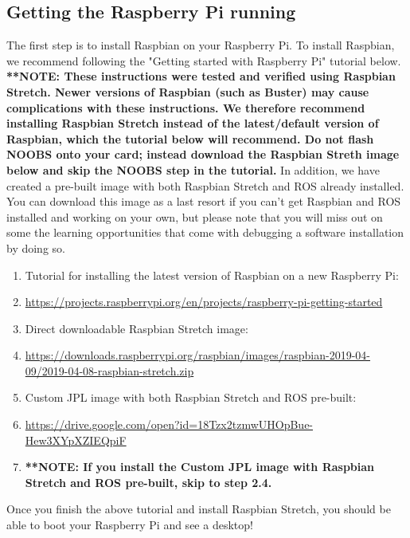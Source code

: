 \documentclass{article}
\begin{document}
\subsection{Getting the Raspberry Pi running}
The first step is to install Raspbian on your Raspberry Pi. To install Raspbian,
we recommend following the "Getting started with Raspberry Pi" tutorial below.  \textbf{**NOTE: These instructions were tested and verified using Raspbian Stretch.  Newer versions of Raspbian (such as Buster) may cause complications with these instructions.  We therefore recommend installing Raspbian Stretch instead of the latest/default version of Raspbian, which the tutorial below will recommend.  Do not flash NOOBS onto your card; instead download the Raspbian Streth image below and skip the NOOBS step in the tutorial.}  In addition, we have created a pre-built image with both Raspbian Stretch and ROS already installed.  You can download this image as a last resort if you can't get Raspbian and ROS installed and working on your own, but please note that you will miss out on some the learning opportunities that come with debugging a software installation by doing so.  

\begin{enumerate}
	\item[] Tutorial for installing the latest version of Raspbian on a new Raspberry Pi:
	\item[] \href{https://projects.raspberrypi.org/en/projects/raspberry-pi-getting-started}{https://projects.raspberrypi.org/en/projects/raspberry-pi-getting-started}
	\item[] Direct downloadable Raspbian Stretch image: 
	\item[] \href{https://downloads.raspberrypi.org/raspbian/images/raspbian-2019-04-09/2019-04-08-raspbian-stretch.zip}{https://downloads.raspberrypi.org/raspbian/images/raspbian-2019-04-09/2019-04-08-raspbian-stretch.zip}
	\item[] Custom JPL image with both Raspbian Stretch and ROS pre-built:
	\item[] \href{https://drive.google.com/open?id=18Tzx2tzmwUHOpBue-Hew3XYpXZIEQpiF}{https://drive.google.com/open?id=18Tzx2tzmwUHOpBue-Hew3XYpXZIEQpiF}
	\item[] \textbf{**NOTE: If you install the Custom JPL image with Raspbian Stretch and ROS pre-built, skip to step 2.4.} 
\end{enumerate}

\noindent Once you finish the above tutorial and install Raspbian Stretch, you should be able to boot your Raspberry Pi and see a desktop!
\end{document}
